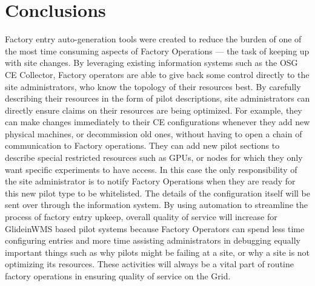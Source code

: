 \documentclass{webofc}
\begin{document}
\section{Conclusions}
\label{conclusions}
Factory entry auto-generation tools were created to reduce the burden of one of the most time consuming aspects of Factory Operations --- the task of keeping up with site changes. By leveraging existing information systems such as the OSG CE Collector, Factory operators are able to give back some control directly to the site administrators, who know the topology of their resources best. By carefully describing their resources in the form of pilot descriptions, site administrators can directly ensure claims on their resources are being optimized. For example, they can make changes immediately to their CE configurations whenever they add new physical machines, or decommission old ones, without having to open a chain of communication to Factory operations. They can add new pilot sections to describe special restricted resources such as GPUs, or nodes for which they only want specific experiments to have access. In this case the only responsibility of the site administrator is to notify Factory Operations when they are ready for this new pilot type to be whitelisted. The details of the configuration itself will be sent over through the information system. By using automation to streamline the process of factory entry upkeep, overall quality of service will increase for GlideinWMS based pilot systems because Factory Operators can spend less time configuring entries and more time assisting administrators in debugging equally important things such as why pilots might be failing at a site, or why a site is not optimizing its resources. These activities will always be a vital part of routine factory operations in ensuring quality of service on the Grid.



%
%
%
%
\end{document}
